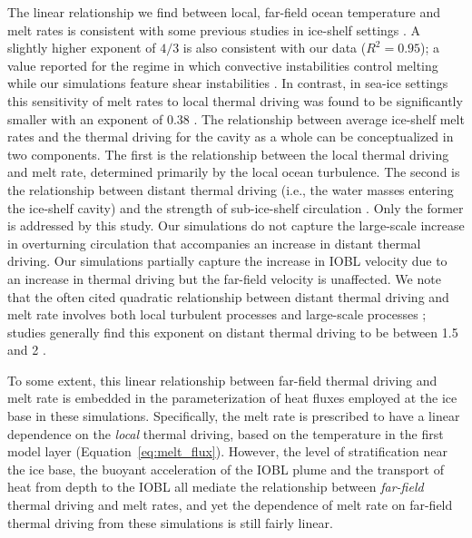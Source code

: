 \documentclass[tc, manuscript]{copernicus}
\begin{document}
The linear relationship we find between local, far-field ocean temperature and melt rates is consistent with some previous studies in ice-shelf settings \citep{holland_response_2008, rignot_rapid_2002, vreugdenhil_stratification_2019}. A slightly higher exponent of $4/3$ is also consistent with our data ($R^2=0.95$); a value reported for the regime in which convective instabilities control melting while our simulations feature shear instabilities \citep{kerr_dissolution_2015}. In contrast, in sea-ice settings this sensitivity of melt rates to local thermal driving was found to be significantly smaller with an exponent of 0.38 \citep{ramudu_large_2018}. The relationship between average ice-shelf melt rates and the thermal driving for the cavity as a whole can be conceptualized in two components. The first is the relationship between the local thermal driving and melt rate, determined primarily by the local ocean turbulence. The second is the relationship between distant thermal driving (i.e., the water masses entering the ice-shelf cavity) and the strength of sub-ice-shelf circulation \citep{holland_response_2008}. Only the former is addressed by this study. Our simulations do not capture the large-scale increase in overturning circulation that accompanies an increase in distant thermal driving. Our simulations partially capture the increase in IOBL velocity due to an increase in thermal driving but the far-field velocity is unaffected. We note that the often cited quadratic relationship between distant thermal driving and melt rate involves both local turbulent processes and large-scale processes \citep{holland_response_2008}; studies generally find this exponent on distant thermal driving to be between 1.5 and 2 \citep{favier_assessment_2019, jourdain_ocean_2017, little_how_2009}. 

To some extent, this linear relationship between far-field thermal driving and melt rate is embedded in the parameterization of heat fluxes employed at the ice base in these simulations. Specifically, the melt rate is prescribed to have a linear dependence on the \textit{local} thermal driving, based on the temperature in the first model layer (Equation~\ref{eq:melt_flux}). However, the level of stratification near the ice base, the buoyant acceleration of the IOBL plume and the transport of heat from depth to the IOBL all mediate the relationship between \textit{far-field} thermal driving and melt rates, and yet the dependence of melt rate on far-field thermal driving from these simulations is still fairly linear.  
\end{document}
